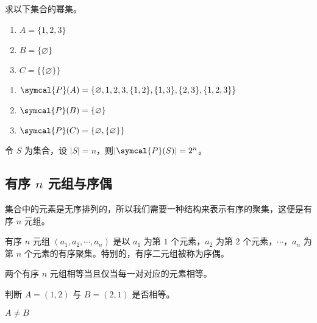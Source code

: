 \documentclass[lang=cn, chinesefont=founder, color=cyan, citestyle=gb7714-2015, bibstyle=gb7714-2015]{elegantbook}
\begin{document}
\begin{collections}
    \begin{example}
        求以下集合的幂集。
        \begin{enumerate}
            \item $A = \{1, 2, 3\}$
            \item $B = \{ \varnothing \}$
            \item $C = \{\{ \varnothing \}\}$
        \end{enumerate}
    \end{example}
    \begin{solution}
        \begin{enumerate}
            \item $\symcal{P}(A) = \{\varnothing, 1, 2, 3, \{1, 2\}, \{1, 3\}, \{2, 3\}, \{1, 2, 3\}\}$
            \item $\symcal{P}(B) = \{\varnothing\}$
            \item $\symcal{P}(C) = \{\varnothing, \{\varnothing\}\}$
        \end{enumerate}
    \end{solution}
\end{collections}

\begin{theorem}
    令 $S$ 为集合，设 $|S| = n$，则$|\symcal{P}(S)| = 2^n$。
\end{theorem}

\subsection{有序 $n$ 元组与序偶}
集合中的元素是无序排列的，所以我们需要一种结构来表示有序的聚集，这便是有序 $n$ 元组。
\begin{definition}[有序 $n$ 元组与序偶]\label{def:有序n元组与序偶}
    有序 $n$ 元组 $(a_1, a_2, \cdots, a_n)$ 是以 $a_1$ 为第 $1$ 个元素，$a_2$ 为第 $2$ 个元素，$\cdots$，$a_n$ 为第 $n$ 个元素的有序聚集。特别的，有序二元组被称为序偶。
\end{definition}

两个有序 $n$ 元组相等当且仅当每一对对应的元素相等。
\begin{collections}
    \begin{example}
        判断 $A=(1, 2)$ 与 $B=(2, 1)$ 是否相等。
    \end{example}
    \begin{solution}
        $A \neq B$
    \end{solution}
\end{collections}
\end{document}
